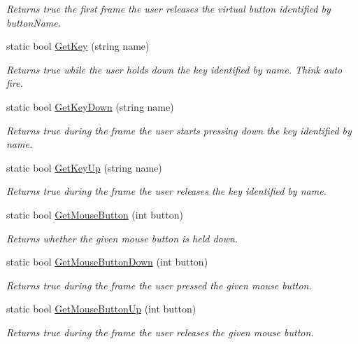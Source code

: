 \begin{DoxyCompactItemize}
\begin{DoxyCompactList}\small\item\em Returns true the first frame the user releases the virtual button identified by button\+Name. \end{DoxyCompactList}\item 
static bool \mbox{\hyperlink{class_lua_1_1_input_abf392b3cf9d208f67a6ea02c0288206a}{Get\+Key}} (string name)
\begin{DoxyCompactList}\small\item\em Returns true while the user holds down the key identified by name. Think auto fire. \end{DoxyCompactList}\item 
static bool \mbox{\hyperlink{class_lua_1_1_input_a8701b16492ad5e1ec79c019d74f7b051}{Get\+Key\+Down}} (string name)
\begin{DoxyCompactList}\small\item\em Returns true during the frame the user starts pressing down the key identified by name. \end{DoxyCompactList}\item 
static bool \mbox{\hyperlink{class_lua_1_1_input_a7c9f4df5dcb4bc4d194da55be31fb0ea}{Get\+Key\+Up}} (string name)
\begin{DoxyCompactList}\small\item\em Returns true during the frame the user releases the key identified by name. \end{DoxyCompactList}\item 
static bool \mbox{\hyperlink{class_lua_1_1_input_a40addbec8d9b18f0dc0cb101edc38b8d}{Get\+Mouse\+Button}} (int button)
\begin{DoxyCompactList}\small\item\em Returns whether the given mouse button is held down. \end{DoxyCompactList}\item 
static bool \mbox{\hyperlink{class_lua_1_1_input_a1a6498f2fab91a72642ac064359edef7}{Get\+Mouse\+Button\+Down}} (int button)
\begin{DoxyCompactList}\small\item\em Returns true during the frame the user pressed the given mouse button. \end{DoxyCompactList}\item 
static bool \mbox{\hyperlink{class_lua_1_1_input_ac9d47356c504c74bfcbee5fff1e9939b}{Get\+Mouse\+Button\+Up}} (int button)
\begin{DoxyCompactList}\small\item\em Returns true during the frame the user releases the given mouse button. \end{DoxyCompactList}\end{DoxyCompactItemize}

